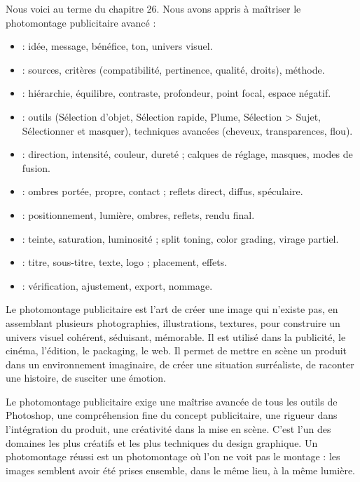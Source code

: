 Nous voici au terme du chapitre 26. Nous avons appris à maîtriser le photomontage publicitaire avancé :

\begin{itemize}
    \item {} : idée, message, bénéfice, ton, univers visuel.
    \item {} : sources, critères (compatibilité, pertinence, qualité, droits), méthode.
    \item {} : hiérarchie, équilibre, contraste, profondeur, point focal, espace négatif.
    \item {} : outils (Sélection d'objet, Sélection rapide, Plume, Sélection > Sujet, Sélectionner et masquer), techniques avancées (cheveux, transparences, flou).
    \item {} : direction, intensité, couleur, dureté ; calques de réglage, masques, modes de fusion.
    \item {} : ombres portée, propre, contact ; reflets direct, diffus, spéculaire.
    \item {} : positionnement, lumière, ombres, reflets, rendu final.
    \item {} : teinte, saturation, luminosité ; split toning, color grading, virage partiel.
    \item {} : titre, sous-titre, texte, logo ; placement, effets.
    \item {} : vérification, ajustement, export, nommage.
\end{itemize}

Le photomontage publicitaire est l'art de créer une image qui n'existe pas, en assemblant plusieurs photographies, illustrations, textures, pour construire un univers visuel cohérent, séduisant, mémorable. Il est utilisé dans la publicité, le cinéma, l'édition, le packaging, le web. Il permet de mettre en scène un produit dans un environnement imaginaire, de créer une situation surréaliste, de raconter une histoire, de susciter une émotion.

Le photomontage publicitaire exige une maîtrise avancée de tous les outils de Photoshop, une compréhension fine du concept publicitaire, une rigueur dans l'intégration du produit, une créativité dans la mise en scène. C'est l'un des domaines les plus créatifs et les plus techniques du design graphique. Un photomontage réussi est un photomontage où l'on ne voit pas le montage : les images semblent avoir été prises ensemble, dans le même lieu, à la même lumière.


